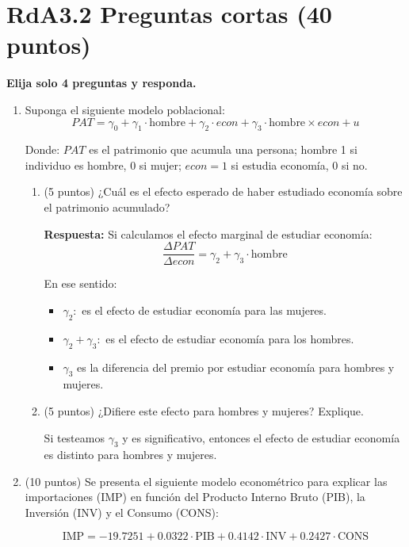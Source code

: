 \documentclass[10pt,a4paper]{article}
\begin{document}
\section{RdA3.2  Preguntas cortas (40 puntos)}
{\bf Elija solo 4 preguntas y responda. }
\begin{enumerate}

\item Suponga el siguiente modelo poblacional:
$$PAT = \gamma_0 + \gamma_1 \cdot \text{hombre} + \gamma_2 \cdot econ + \gamma_3 \cdot \text{hombre} \times econ +u$$

Donde: $PAT$ es el patrimonio que acumula una persona; hombre 1 si individuo es hombre, 0 si mujer; $econ = 1$ si estudia economía, 0 si no.
\begin{enumerate}
    \item[(a)] (5 puntos) ¿Cuál es el efecto esperado de haber estudiado economía sobre el patrimonio acumulado?
    {\color{blue}
    \textbf{Respuesta:} Si calculamos el efecto marginal de estudiar economía:
    $$\frac{\Delta PAT}{\Delta econ} = \gamma_2 + \gamma_3 \cdot \text{hombre}$$


En ese sentido:

\begin{itemize}
    \item $\gamma_2:$ es el efecto de estudiar economía para las mujeres.
    \item $\gamma_2 + \gamma_3:$ es el efecto de estudiar economía para los hombres.
    \item $\gamma_3$ es la diferencia del premio por estudiar economía para hombres y mujeres.
    \end{itemize}}
    \item[(b)] (5 puntos) ¿Difiere este efecto para
hombres y mujeres? Explique.

  {\color{blue} Si testeamos $\gamma_3$ y es significativo, entonces el efecto de estudiar economía es distinto para hombres y mujeres.}
\end{enumerate}








\item (10 puntos) 
Se presenta el siguiente modelo econométrico para explicar las importaciones (IMP) en función del Producto Interno Bruto (PIB), la Inversión (INV) y el Consumo (CONS):

\[
\text{IMP} = -19.7251 + 0.0322 \cdot \text{PIB} + 0.4142 \cdot \text{INV} + 0.2427 \cdot \text{CONS}
\]


\end{enumerate}
\end{document}
